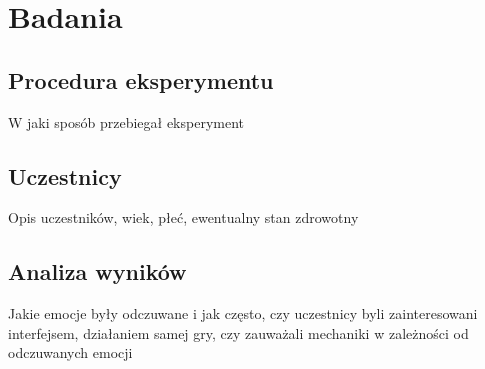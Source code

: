 \chapter{Badania}
\label{cha:badania}
\section{Procedura eksperymentu}
W jaki sposób przebiegał eksperyment 
\section{Uczestnicy}
Opis uczestników, wiek, płeć, ewentualny stan zdrowotny
\section{Analiza wyników}
Jakie emocje były odczuwane i jak często, czy uczestnicy byli zainteresowani interfejsem, działaniem samej gry, czy zauważali mechaniki w zależności od odczuwanych emocji